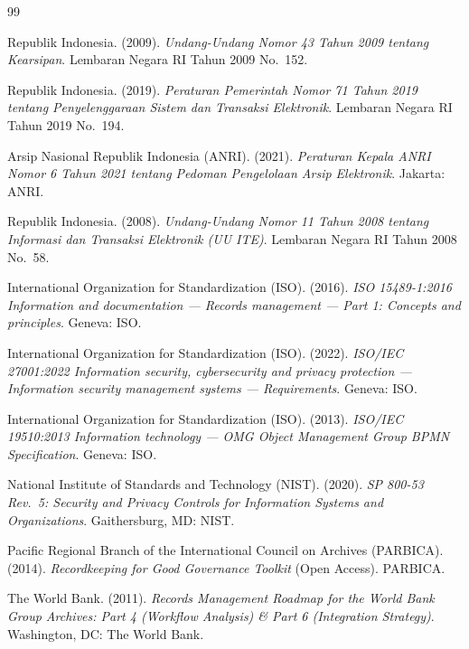 \documentclass[11pt,a4paper]{article}
\begin{document}
\begin{thebibliography}{99}
\small

 Republik Indonesia. (2009). \textit{Undang-Undang Nomor 43 Tahun 2009 tentang Kearsipan}. Lembaran Negara RI Tahun 2009 No.~152.

 Republik Indonesia. (2019). \textit{Peraturan Pemerintah Nomor 71 Tahun 2019 tentang Penyelenggaraan Sistem dan Transaksi Elektronik}. Lembaran Negara RI Tahun 2019 No.~194.

 Arsip Nasional Republik Indonesia (ANRI). (2021). \textit{Peraturan Kepala ANRI Nomor 6 Tahun 2021 tentang Pedoman Pengelolaan Arsip Elektronik}. Jakarta: ANRI.

 Republik Indonesia. (2008). \textit{Undang-Undang Nomor 11 Tahun 2008 tentang Informasi dan Transaksi Elektronik (UU ITE)}. Lembaran Negara RI Tahun 2008 No.~58.

 International Organization for Standardization (ISO). (2016). \textit{ISO 15489-1:2016 Information and documentation --- Records management --- Part 1: Concepts and principles}. Geneva: ISO.

 International Organization for Standardization (ISO). (2022). \textit{ISO/IEC 27001:2022 Information security, cybersecurity and privacy protection --- Information security management systems --- Requirements}. Geneva: ISO.

 International Organization for Standardization (ISO). (2013). \textit{ISO/IEC 19510:2013 Information technology --- OMG Object Management Group BPMN Specification}. Geneva: ISO.

 National Institute of Standards and Technology (NIST). (2020). \textit{SP 800-53 Rev.~5: Security and Privacy Controls for Information Systems and Organizations}. Gaithersburg, MD: NIST.

 Pacific Regional Branch of the International Council on Archives (PARBICA). (2014). \textit{Recordkeeping for Good Governance Toolkit} (Open Access). PARBICA.

 The World Bank. (2011). \textit{Records Management Roadmap for the World Bank Group Archives: Part 4 (Workflow Analysis) \& Part 6 (Integration Strategy)}. Washington, DC: The World Bank.


\end{thebibliography}
\end{document}
